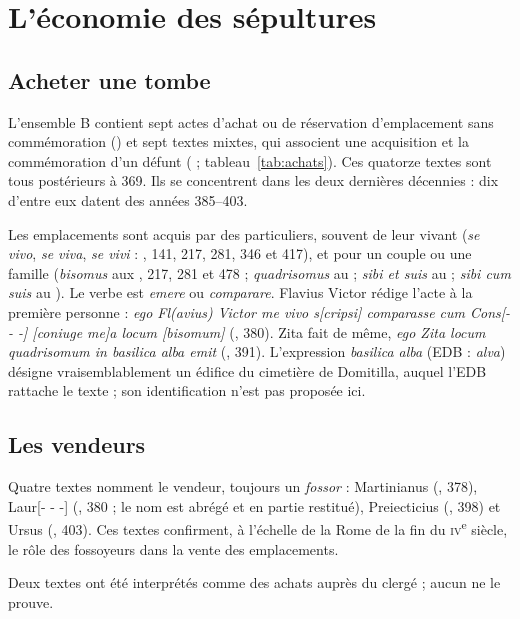 \chapter{L’économie des sépultures}\label{ch:sepultures}

\section{Acheter une tombe}

L’ensemble B contient sept actes d’achat ou de réservation d’emplacement sans commémoration () et sept textes mixtes, qui associent une acquisition et la commémoration d’un défunt ( ; tableau~\ref{tab:achats}). Ces quatorze textes sont tous postérieurs à 369. Ils se concentrent dans les deux dernières décennies : dix d’entre eux datent des années 385–403.



Les emplacements sont acquis par des particuliers, souvent de leur vivant (\emph{se vivo}, \emph{se viva}, \emph{se vivi} : , 141, 217, 281, 346 et 417), et pour un couple ou une famille (\emph{bisomus} aux , 217, 281 et 478 ; \emph{quadrisomus} au  ; \emph{sibi et suis} au  ; \emph{sibi cum suis} au ). Le verbe est \emph{emere} ou \emph{comparare}. Flavius Victor rédige l’acte à la première personne : \emph{ego Fl(avius) Victor me vivo s[cripsi] comparasse cum Cons[- - -] [coniuge me]a locum [bisomum]} (, 380). Zita fait de même, \emph{ego Zita locum quadrisomum in basilica alba emit} (, 391). L’expression \emph{basilica alba} (EDB : \emph{alva}) désigne vraisemblablement un édifice du cimetière de Domitilla, auquel l’EDB rattache le texte ; son identification n’est pas proposée ici.

\section{Les vendeurs}

Quatre textes nomment le vendeur, toujours un \emph{fossor} : Martinianus (, 378), Laur[- - -] (, 380 ; le nom est abrégé et en partie restitué), Preiecticius (, 398) et Ursus (, 403). Ces textes confirment, à l’échelle de la Rome de la fin du \textsc{iv}\textsuperscript{e} siècle, le rôle des fossoyeurs dans la vente des emplacements.

Deux textes ont été interprétés comme des achats auprès du clergé ; aucun ne le prouve.

